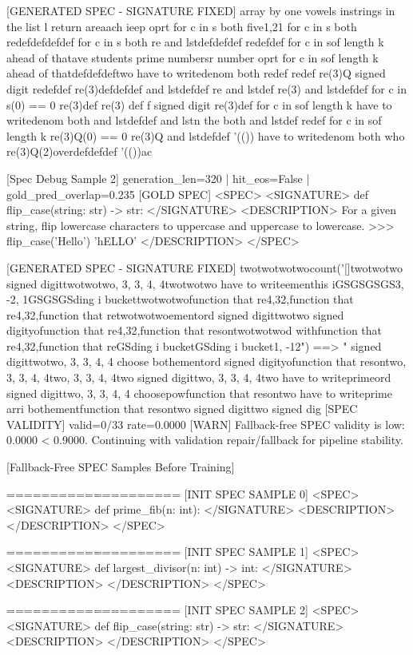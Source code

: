 [GENERATED SPEC - SIGNATURE FIXED]
array by one vowels instrings in the list l return areaach ieep oprt for c in s both five1,21 for c in s both redefdefdefdef for c in s both re and lstdefdefdef redefdef for c in sof length k ahead of thatave students prime numbersr number oprt for c in sof length k ahead of thatdefdefdeftwo have to writedenom both redef redef re(3)Q signed digit redefdef re(3)defdefdef and lstdefdef re and lstdef re(3) and lstdefdef for c in s(0) == 0 re(3)def re(3) def f signed digit re(3)def for c in sof length k have to writedenom both and lstdefdef and lstn the both and lstdef redef for c in sof length k re(3)Q(0) == 0 re(3)Q and lstdefdef '(()) have to writedenom both who re(3)Q(2)overdefdefdef '(())ac

[Spec Debug Sample 2]
generation_len=320 | hit_eos=False | gold_pred_overlap=0.235
[GOLD SPEC]
<SPEC> <SIGNATURE> def flip_case(string: str) -> str: </SIGNATURE> <DESCRIPTION> For a given string, flip lowercase characters to uppercase and uppercase to lowercase. >>> flip_case('Hello') 'hELLO' </DESCRIPTION> </SPEC>

[GENERATED SPEC - SIGNATURE FIXED]
twotwotwotwocount('[]twotwotwo signed digittwotwotwo, 3, 3, 4, 4twotwotwo have to writeementhis iGSGSGSGS3, -2, 1GSGSGSding i buckettwotwotwofunction that re4,32,function that re4,32,function that retwotwotwoementord signed digittwotwo signed digityofunction that re4,32,function that resontwotwotwod withfunction that re4,32,function that reGSding i bucketGSding i bucket1, -12") ==> " signed digittwotwo, 3, 3, 4, 4 choose bothementord signed digityofunction that resontwo, 3, 3, 4, 4two, 3, 3, 4, 4two signed digittwo, 3, 3, 4, 4two have to writeprimeord signed digittwo, 3, 3, 4, 4 choosepowfunction that resontwo have to writeprime arri bothementfunction that resontwo signed digittwo signed dig
[SPEC VALIDITY] valid=0/33 rate=0.0000
[WARN] Fallback-free SPEC validity is low: 0.0000 < 0.9000. Continuing with validation repair/fallback for pipeline stability.

[Fallback-Free SPEC Samples Before Training]

====================
[INIT SPEC SAMPLE 0]
<SPEC> <SIGNATURE> def prime_fib(n: int): </SIGNATURE> <DESCRIPTION> </DESCRIPTION> </SPEC>

====================
[INIT SPEC SAMPLE 1]
<SPEC> <SIGNATURE> def largest_divisor(n: int) -> int: </SIGNATURE> <DESCRIPTION> </DESCRIPTION> </SPEC>

====================
[INIT SPEC SAMPLE 2]
<SPEC> <SIGNATURE> def flip_case(string: str) -> str: </SIGNATURE> <DESCRIPTION> </DESCRIPTION> </SPEC>

